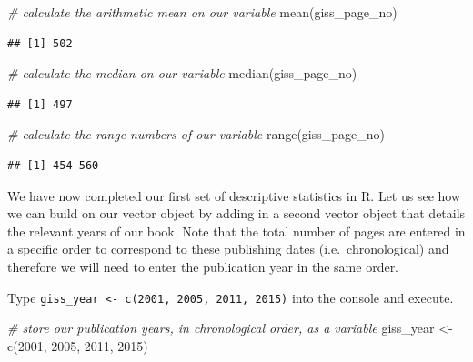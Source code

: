 \documentclass[
]{book}
\newenvironment{Shaded}{\begin{snugshade}}{\end{snugshade}}
\newcommand{\CommentTok}[1]{\textcolor[rgb]{0.56,0.35,0.01}{\textit{#1}}}
\newcommand{\DecValTok}[1]{\textcolor[rgb]{0.00,0.00,0.81}{#1}}
\newcommand{\FunctionTok}[1]{\textcolor[rgb]{0.00,0.00,0.00}{#1}}
\newcommand{\NormalTok}[1]{#1}
\newcommand{\OtherTok}[1]{\textcolor[rgb]{0.56,0.35,0.01}{#1}}
\begin{document}
\begin{Shaded}
\begin{Highlighting}[]
\CommentTok{\# calculate the arithmetic mean on our variable}
\FunctionTok{mean}\NormalTok{(giss\_page\_no)}
\end{Highlighting}
\end{Shaded}

\begin{verbatim}
## [1] 502
\end{verbatim}

\begin{Shaded}
\begin{Highlighting}[]
\CommentTok{\# calculate the median on our variable}
\FunctionTok{median}\NormalTok{(giss\_page\_no)}
\end{Highlighting}
\end{Shaded}

\begin{verbatim}
## [1] 497
\end{verbatim}

\begin{Shaded}
\begin{Highlighting}[]
\CommentTok{\# calculate the range numbers of our variable}
\FunctionTok{range}\NormalTok{(giss\_page\_no)}
\end{Highlighting}
\end{Shaded}

\begin{verbatim}
## [1] 454 560
\end{verbatim}

We have now completed our first set of descriptive statistics in R. Let us see how we can build on our vector object by adding in a second vector object that details the relevant years of our book. Note that the total number of pages are entered in a specific order to correspond to these publishing dates (i.e.~chronological) and therefore we will need to enter the publication year in the same order.

Type \texttt{giss\_year\ \textless{}-\ c(2001,\ 2005,\ 2011,\ 2015)} into the console and execute.

\begin{Shaded}
\begin{Highlighting}[]
\CommentTok{\# store our publication years, in chronological order, as a variable}
\NormalTok{giss\_year }\OtherTok{\textless{}{-}} \FunctionTok{c}\NormalTok{(}\DecValTok{2001}\NormalTok{, }\DecValTok{2005}\NormalTok{, }\DecValTok{2011}\NormalTok{, }\DecValTok{2015}\NormalTok{)}
\end{Highlighting}
\end{Shaded}
\end{document}
